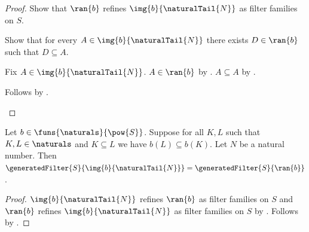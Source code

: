 \begin{proof}
    Show that $\ran{b}$ refines $\img{b}{\naturalTail{N}}$
        as filter families on $S$.
    \begin{subproof}
        Show that for every $A\in\img{b}{\naturalTail{N}}$
            there exists $D\in\ran{b}$ such that $D\subseteq A$.
        \begin{subproof}
            Fix $A\in\img{b}{\naturalTail{N}}$.
            $A\in\ran{b}$ by .
            $A\subseteq A$ by .
        \end{subproof}
        Follows by .
    \end{subproof}
\end{proof}

\begin{corollary}\label{antitone_natural_tail_generated_filters_equal}
    Let $b\in\funs{\naturals}{\pow{S}}$.
    Suppose for all $K,L$ such that $K,L\in\naturals$ and $K\subseteq L$
        we have $b(L)\subseteq b(K)$.
    Let $N$ be a natural number.
    Then
        $\generatedFilter{S}{\img{b}{\naturalTail{N}}}
        =\generatedFilter{S}{\ran{b}}$.
\end{corollary}
\begin{proof}
    $\img{b}{\naturalTail{N}}$ refines $\ran{b}$
        as filter families on $S$ and
        $\ran{b}$ refines $\img{b}{\naturalTail{N}}$
        as filter families on $S$
        by .
    Follows by
        .
\end{proof}

